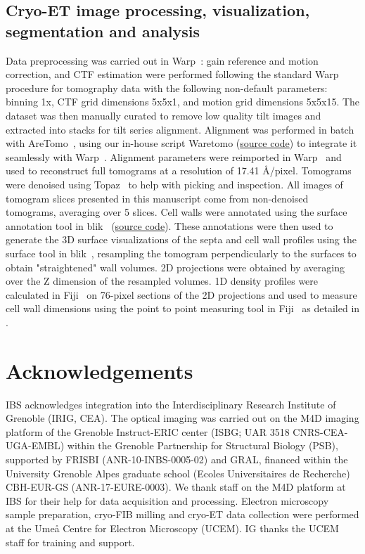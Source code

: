 \subsection[Cryo-ET data processing]{Cryo-ET image processing, visualization, segmentation and analysis}
Data preprocessing was carried out in Warp~\cite{tegunovRealtimeCryoelectronMicroscopy2019}: gain reference and motion correction, and CTF estimation were performed following the standard Warp~\cite{tegunovRealtimeCryoelectronMicroscopy2019} procedure for tomography data with the following non-default parameters: binning 1x, CTF grid dimensions 5x5x1, and motion grid dimensions 5x5x15.
The dataset was then manually curated to remove low quality tilt images and extracted into stacks for tilt series alignment.
Alignment was performed in batch with AreTomo~\cite{zhengAreTomoIntegratedSoftware2022}, using our in-house script Waretomo (\href{https://doi.org/10.5281/zenodo.13350542}{source code}) to integrate it seamlessly with Warp~\cite{tegunovRealtimeCryoelectronMicroscopy2019}.
Alignment parameters were reimported in Warp~\cite{tegunovRealtimeCryoelectronMicroscopy2019} and used to reconstruct full tomograms at a resolution of 17.41 Å/pixel.
Tomograms were denoised using Topaz~\cite{beplerTopazDenoiseGeneralDeep2020} to help with picking and inspection.
All images of tomogram slices presented in this manuscript come from non-denoised tomograms, averaging over 5 slices.
Cell walls were annotated using the surface annotation tool in blik~\cite{gaifasBlikExtensible3D2024} (\href{https://zenodo.org/records/10894490}{source code}).
These annotations were then used to generate the 3D surface visualizations of the septa and cell wall profiles using the surface tool in blik~\cite{gaifasBlikExtensible3D2024}, resampling the tomogram perpendicularly to the surfaces to obtain "straightened" wall volumes.
2D projections were obtained by averaging over the Z dimension of the resampled volumes.
1D density profiles were calculated in Fiji~\cite{schindelinFijiOpensourcePlatform2012} on 76-pixel sections of the 2D projections and used to measure cell wall dimensions using the point to point measuring tool in Fiji~\cite{schindelinFijiOpensourcePlatform2012} as detailed in .

\section{Acknowledgements}
IBS acknowledges integration into the Interdisciplinary Research Institute of Grenoble (IRIG, CEA).
The optical imaging was carried out on the M4D imaging platform of the Grenoble Instruct-ERIC center (ISBG; UAR 3518 CNRS-CEA-UGA-EMBL) within the Grenoble Partnership for Structural Biology (PSB), supported by FRISBI (ANR-10-INBS-0005-02) and GRAL, financed within the University Grenoble Alpes graduate school (Ecoles Universitaires de Recherche) CBH-EUR-GS (ANR-17-EURE-0003).
We thank staff on the M4D platform at IBS for their help for data acquisition and processing.
Electron microscopy sample preparation, cryo-FIB milling and cryo-ET data collection were performed at the Umeå Centre for Electron Microscopy (UCEM).
IG thanks the UCEM staff for training and support.

